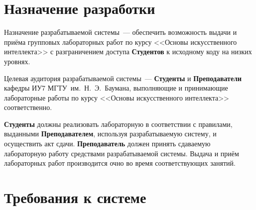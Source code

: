 \documentclass{bmstu}
\begin{document}
  \section{Назначение разработки}

  Назначение разрабатываемой системы~--- обеспечить возможность выдачи и приёма
  групповых лабораторных работ по курсу <<Основы искусственного интеллекта>> с
  разграничением доступа \textbf{Студентов} к исходному коду на низких уровнях.

  Целевая аудитория разрабатываемой системы~--- \textbf{Студенты} и
  \textbf{Преподаватели} кафедры ИУ7 МГТУ~им.~Н.~Э.~Баумана, выполняющие и
  принимающие лабораторные работы по курсу <<Основы искусственного интеллекта>>
  соответственно.

  \textbf{Студенты} должны реализовать лабораторную в соответствии с правилами,
  выданными \textbf{Преподавателем}, используя разрабатываемую систему, и
  осуществить акт сдачи.
  \textbf{Преподаватель} должен принять сдаваемую лабораторную работу
  средствами разрабатываемой системы.
  Выдача и приём лабораторных работ производится очно во время соответствующих занятий.

  \section{Требования к системе}
\end{document}
